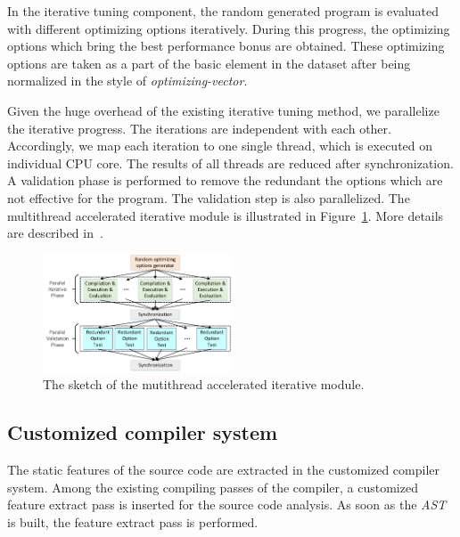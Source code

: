 \documentclass[bst/sn-mathphys]{sn-jnl}%
\theoremstyle{thmstyleone}%
\theoremstyle{thmstyletwo}%
\theoremstyle{thmstylethree}%
\begin{document}
In the iterative tuning component, the random generated program is evaluated 
with different optimizing options iteratively. During this progress, the 
optimizing options which bring the best performance bonus are obtained. These 
optimizing options are taken as a part of the basic element in the dataset 
after being normalized in the style of \emph{optimizing-vector}.

Given the huge overhead of the existing iterative tuning method, we parallelize 
the iterative progress. The iterations are independent with each other. 
Accordingly, we map each iteration to one single thread, which is executed on 
individual CPU core. The results of all threads are reduced after 
synchronization. A validation phase is performed to remove the redundant the 
options which are not effective for the program. The validation step is also 
parallelized. The multithread accelerated iterative module is illustrated in 
Figure~\ref{FIG3}. More details are described in~\cite{jinwei2021}.

\begin{figure}[h]%
\centering
\includegraphics[width=0.5\textwidth]{fig/fig3.pdf}
\caption{The sketch of the mutithread accelerated iterative module.}\label{FIG3}
\end{figure}

\subsection{Customized compiler system}\label{sec0403}

The static features of the source code are extracted in the customized 
compiler system. Among the existing compiling passes of the compiler, a 
customized feature extract pass is inserted for the source code analysis. As 
soon as the \emph{AST} is built, the feature extract pass is performed.
\end{document}
